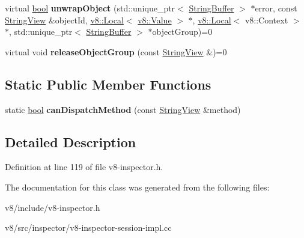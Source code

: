 \begin{DoxyCompactItemize}
virtual \mbox{\hyperlink{classbool}{bool}} {\bfseries unwrap\+Object} (std\+::unique\+\_\+ptr$<$ \mbox{\hyperlink{classv8__inspector_1_1StringBuffer}{String\+Buffer}} $>$ $\ast$error, const \mbox{\hyperlink{classv8__inspector_1_1StringView}{String\+View}} \&object\+Id, \mbox{\hyperlink{classv8_1_1Local}{v8\+::\+Local}}$<$ \mbox{\hyperlink{classv8_1_1Value}{v8\+::\+Value}} $>$ $\ast$, \mbox{\hyperlink{classv8_1_1Local}{v8\+::\+Local}}$<$ v8\+::\+Context $>$ $\ast$, std\+::unique\+\_\+ptr$<$ \mbox{\hyperlink{classv8__inspector_1_1StringBuffer}{String\+Buffer}} $>$ $\ast$object\+Group)=0
\item 
\mbox{\label{classv8__inspector_1_1V8InspectorSession_a3a7e04f754c93086d7e61ad483bd38aa}} 
virtual void {\bfseries release\+Object\+Group} (const \mbox{\hyperlink{classv8__inspector_1_1StringView}{String\+View}} \&)=0
\end{DoxyCompactItemize}
\subsection*{Static Public Member Functions}
\begin{DoxyCompactItemize}
\item 
\mbox{\label{classv8__inspector_1_1V8InspectorSession_a3d58da86d01d8c9f94e09825b498ec5e}} 
static \mbox{\hyperlink{classbool}{bool}} {\bfseries can\+Dispatch\+Method} (const \mbox{\hyperlink{classv8__inspector_1_1StringView}{String\+View}} \&method)
\end{DoxyCompactItemize}


\subsection{Detailed Description}


Definition at line 119 of file v8-\/inspector.\+h.



The documentation for this class was generated from the following files\+:\begin{DoxyCompactItemize}
\item 
v8/include/v8-\/inspector.\+h\item 
v8/src/inspector/v8-\/inspector-\/session-\/impl.\+cc\end{DoxyCompactItemize}
